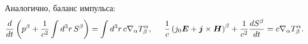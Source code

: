 Аналогично, баланс импульса:
\begin{equation*}
    \frac{d }{d t} \left(p^\beta + \frac{1}{c^2} \int d^3 r \, S^\beta\right) = \int d^3 r \, c \nabla_\alpha T^\alpha_\beta,
    \hspace{5 mm} 
    \frac{1}{c}\left(
        j_0 \mbox{\boldmath $E$} + \mbox{\boldmath $j$} \times  \mbox{\boldmath $H$}
    \right)^\beta + \frac{1}{c^2} \frac{d S^\beta}{d t} = c \nabla_\alpha T^\alpha_\beta.
\end{equation*}

